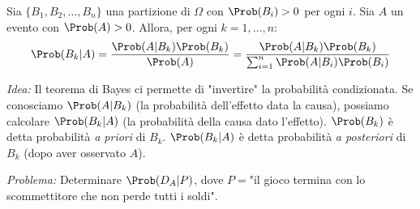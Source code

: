 \begin{theorem}
Sia $\{B_1, B_2, \dots, B_n\}$ una partizione di $\Omega$ con $\Prob(B_i) > 0$ per ogni $i$. Sia $A$ un evento con $\Prob(A) > 0$. Allora, per ogni $k=1, \dots, n$:
\[ \Prob(B_k|A) = \frac{\Prob(A|B_k) \Prob(B_k)}{\Prob(A)} = \frac{\Prob(A|B_k) \Prob(B_k)}{\sum_{i=1}^n \Prob(A|B_i) \Prob(B_i)} \]
\end{theorem}
\textit{Idea:} Il teorema di Bayes ci permette di "invertire" la probabilità condizionata. Se conosciamo $\Prob(A|B_k)$ (la probabilità dell'effetto data la causa), possiamo calcolare $\Prob(B_k|A)$ (la probabilità della causa dato l'effetto).
$\Prob(B_k)$ è detta probabilità \textit{a priori} di $B_k$.
$\Prob(B_k|A)$ è detta probabilità \textit{a posteriori} di $B_k$ (dopo aver osservato $A$).

\begin{example}\label{example:esercizio_1_punto_4}
\textit{Problema:} Determinare $\Prob(D_A|P)$, dove $P = $"il gioco termina con lo scommettitore che non perde tutti i soldi".


\end{example}
